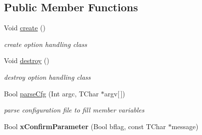 \subsection*{Public Member Functions}
\begin{DoxyCompactItemize}
\item 
\mbox{\label{class_t_app_renderer_cfg_ac3ccb635880c27e73cc2ce750e1f01a9}} 
Void \hyperlink{class_t_app_renderer_cfg_ac3ccb635880c27e73cc2ce750e1f01a9}{create} ()
\begin{DoxyCompactList}\small\item\em create option handling class \end{DoxyCompactList}\item 
\mbox{\label{class_t_app_renderer_cfg_a8d9d74f43fcebb0ddd311b40f8a4bdc6}} 
Void \hyperlink{class_t_app_renderer_cfg_a8d9d74f43fcebb0ddd311b40f8a4bdc6}{destroy} ()
\begin{DoxyCompactList}\small\item\em destroy option handling class \end{DoxyCompactList}\item 
Bool \hyperlink{class_t_app_renderer_cfg_a34af17ae3bc4e6a66c4b67b5914dcb51}{parse\+Cfg} (Int argc, T\+Char $\ast$argv\mbox{[}$\,$\mbox{]})
\begin{DoxyCompactList}\small\item\em parse configuration file to fill member variables \end{DoxyCompactList}\item 
\mbox{\label{class_t_app_renderer_cfg_ac32f616c11e3c1181901a42998eb638b}} 
Bool {\bfseries x\+Confirm\+Parameter} (Bool bflag, const T\+Char $\ast$message)
\end{DoxyCompactItemize}
